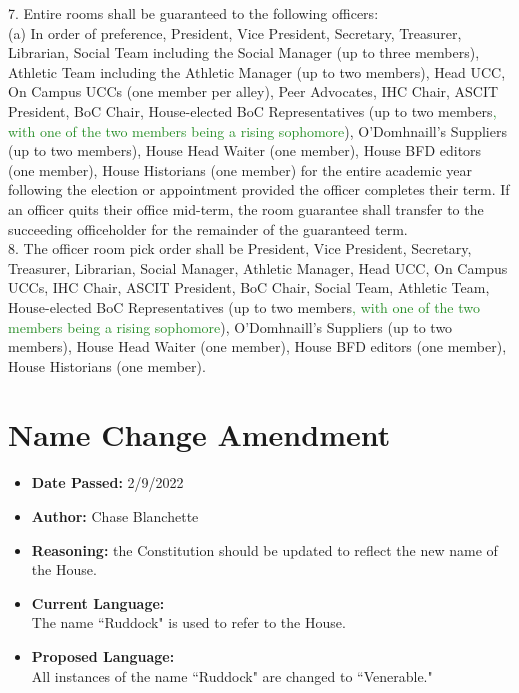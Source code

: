 \documentclass[10pt]{article} %
\begin{document}
\begin{itemize}
	7. Entire rooms shall be guaranteed to the following officers: \\
	(a) In order of preference, President, Vice President, Secretary, Treasurer, Librarian, Social Team including the Social Manager (up to three members), Athletic Team including the Athletic Manager (up to two members), Head UCC, On Campus UCCs (one member per alley), Peer Advocates, IHC Chair, ASCIT President, BoC Chair, House-elected BoC Representatives (up to two members\textcolor{ForestGreen}{, with one of the two members being a rising sophomore}), O'Domhnaill's Suppliers (up to two members), House Head Waiter (one member), House BFD editors (one member), House Historians (one member) for the entire academic year following the election or appointment provided the officer completes their term. If an officer quits their office mid-term, the room guarantee shall transfer to the succeeding officeholder for the remainder of the guaranteed term. \\
	8. The officer room pick order shall be President, Vice President, Secretary, Treasurer, Librarian, Social Manager, Athletic Manager, Head UCC, On Campus UCCs, IHC Chair, ASCIT President, BoC Chair, Social Team, Athletic Team, House-elected BoC Representatives (up to two members\textcolor{ForestGreen}{, with one of the two members being a rising sophomore}), O'Domhnaill's Suppliers (up to two members), House Head Waiter (one member), House BFD editors (one member), House Historians (one member).
\end{itemize}

\section{Name Change Amendment}
\begin{itemize}
	\item \textbf{Date Passed:} 2/9/2022
	\item \textbf{Author:} Chase Blanchette
	\item \textbf{Reasoning:} the Constitution should be updated to reflect the new name of the House.
	\item \textbf{Current Language:} \\
	The name ``Ruddock" is used to refer to the House.
	\item \textbf{Proposed Language:} \\
	All instances of the name ``Ruddock" are changed to ``Venerable."
\end{itemize}
\end{document}
